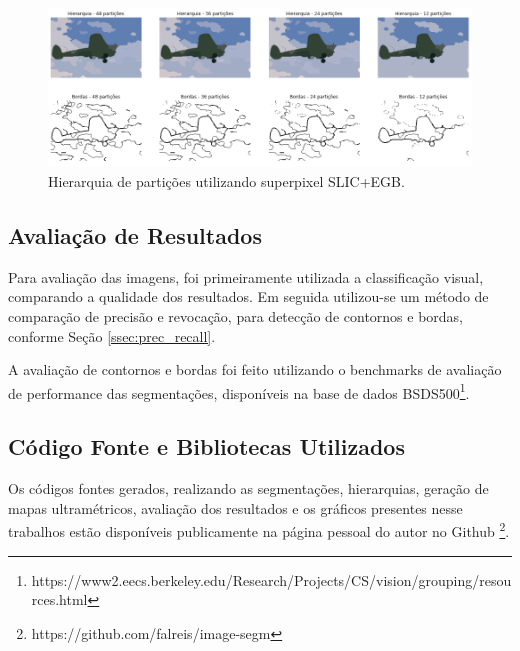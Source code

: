 \begin{document}
\begin{figure}[ht]
\centering
\includegraphics[width=1.\textwidth]{slic_hierarquia_particoes.png}
\caption{Hierarquia de partições utilizando superpixel SLIC+EGB.}
\label{fig:hierarq_partit}
\end{figure}



\subsection{Avaliação de Resultados} \label{ssec:aval_resultados}

Para avaliação das imagens, foi primeiramente utilizada a classificação visual, comparando a qualidade dos resultados. Em seguida utilizou-se um método de comparação de precisão e revocação, para detecção de contornos e bordas, conforme Seção \ref{ssec:prec_recall}. 

A avaliação de contornos e bordas foi feito utilizando o benchmarks de avaliação de performance das segmentações, disponíveis na base de dados BSDS500\footnote{https://www2.eecs.berkeley.edu/Research/Projects/CS/vision/grouping/resources.html}.



\subsection{Código Fonte e Bibliotecas Utilizados} \label{ssec:cod_fonte}

Os códigos fontes gerados, realizando as segmentações, hierarquias, geração de mapas ultramétricos, avaliação dos resultados e os gráficos presentes nesse trabalhos estão disponíveis publicamente na página pessoal do autor no Github \footnote{https://github.com/falreis/image-segm}.
\end{document}
